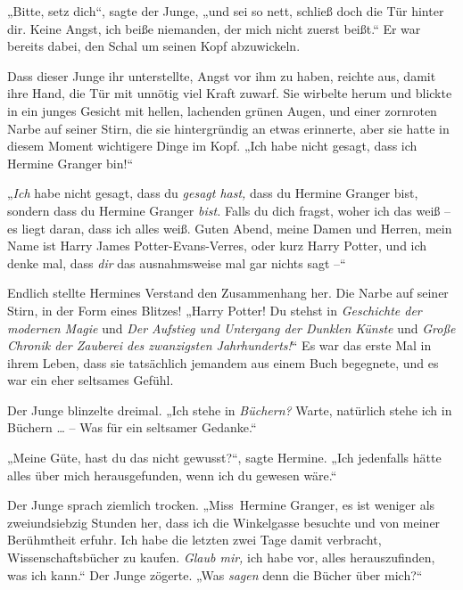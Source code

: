 „Bitte, setz dich“, sagte der Junge, „und sei so nett, schließ doch die Tür hinter dir. Keine Angst, ich beiße niemanden, der mich nicht zuerst beißt.“ Er war bereits dabei, den Schal um seinen Kopf abzuwickeln. 

Dass dieser Junge ihr unterstellte, Angst vor ihm zu haben, reichte aus, damit ihre Hand, die Tür mit unnötig viel Kraft zuwarf. Sie wirbelte herum und blickte in ein junges Gesicht mit hellen, lachenden grünen Augen, und einer zornroten Narbe auf seiner Stirn, die sie hintergründig an etwas erinnerte, aber sie hatte in diesem Moment wichtigere Dinge im Kopf. „Ich habe nicht gesagt, dass ich Hermine Granger bin!“ 

„\emph{Ich} habe nicht gesagt, dass du \emph{gesagt hast,} dass du Hermine Granger bist, sondern dass du Hermine Granger \emph{bist.} Falls du dich fragst, woher ich das weiß – es liegt daran, dass ich alles weiß. Guten Abend, meine Damen und Herren, mein Name ist Harry James Potter-Evans-Verres, oder kurz Harry Potter, und ich denke mal, dass \emph{dir} das ausnahmsweise mal gar nichts sagt –“ 

Endlich stellte Hermines Verstand den Zusammenhang her. Die Narbe auf seiner Stirn, in der Form eines Blitzes! „Harry Potter! Du stehst in \emph{Geschichte der modernen Magie} und \emph{Der Aufstieg und Untergang der Dunklen Künste} und \emph{Große Chronik der Zauberei des zwanzigsten Jahrhunderts!}“ Es war das erste Mal in ihrem Leben, dass sie tatsächlich jemandem aus einem Buch begegnete, und es war ein eher seltsames Gefühl. 

Der Junge blinzelte dreimal. „Ich stehe in \emph{Büchern?} Warte, natürlich stehe ich in Büchern … – Was für ein seltsamer Gedanke.“ 

„Meine Güte, hast du das nicht gewusst?“, sagte Hermine. „Ich jedenfalls hätte alles über mich herausgefunden, wenn ich du gewesen wäre.“ 

Der Junge sprach ziemlich trocken. „Miss~Hermine Granger, es ist weniger als zweiundsiebzig Stunden her, dass ich die Winkelgasse besuchte und von meiner Berühmtheit erfuhr. Ich habe die letzten zwei Tage damit verbracht, Wissenschaftsbücher zu kaufen. \emph{Glaub mir,} ich habe vor, alles herauszufinden, was ich kann.“ Der Junge zögerte. „Was \emph{sagen} denn die Bücher über mich?“ 

